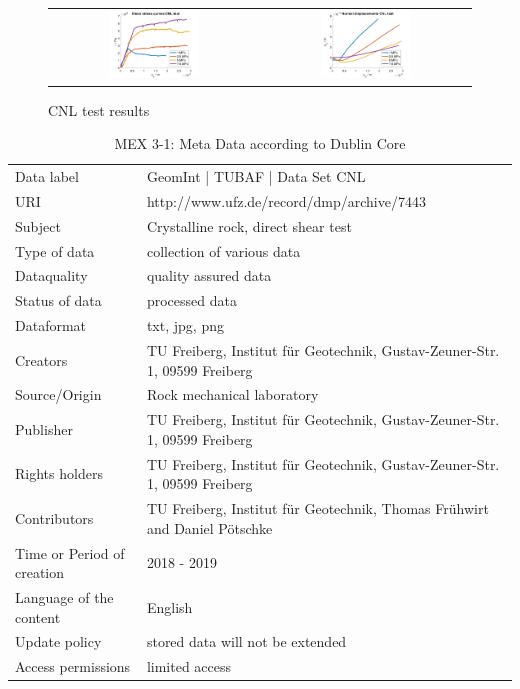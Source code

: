 \begin{figure}[!ht]
\begin{tabular}{cc}
\includegraphics[width=0.45\textwidth]{./figures/CNLShearCurvesAll.png}     
& 
\includegraphics[width=0.45\textwidth]{./figures/CNLDilatationAll.png} 
\end{tabular}
\caption{CNL test results}
\label{fig:DataCNLGraniteLab}
\end{figure}

\begin{table}[h!]
\caption{MEX 3-1: Meta Data according to Dublin Core}
\label{tab:}
\small
\begin{tabular}{R{3cm}|L{7cm}}
\hline
%
Data label & GeomInt | TUBAF | Data Set CNL \\
URI & http://www.ufz.de/record/dmp/archive/7443 \\
Subject  & Crystalline rock, direct shear test \\
Type of data  & collection of various data \\
Dataquality  & quality assured data \\
Status of data  & processed data \\
Dataformat  & txt, jpg, png \\
Creators  & TU Freiberg, Institut für Geotechnik, Gustav-Zeuner-Str. 1, 09599 Freiberg \\
Source/Origin  & Rock mechanical laboratory \\
Publisher  & TU Freiberg, Institut für Geotechnik, Gustav-Zeuner-Str. 1, 09599 Freiberg \\
Rights holders  & TU Freiberg, Institut für Geotechnik, Gustav-Zeuner-Str. 1, 09599 Freiberg \\
Contributors  & TU Freiberg, Institut für Geotechnik, Thomas Fr\"uhwirt and Daniel P\"otschke \\
Time or Period of creation  & 2018 - 2019 \\
Language of the content & English \\
Update policy  & stored data will not be extended \\
Access permissions  & limited access \\
%
\hline
\end{tabular}
\end{table}

